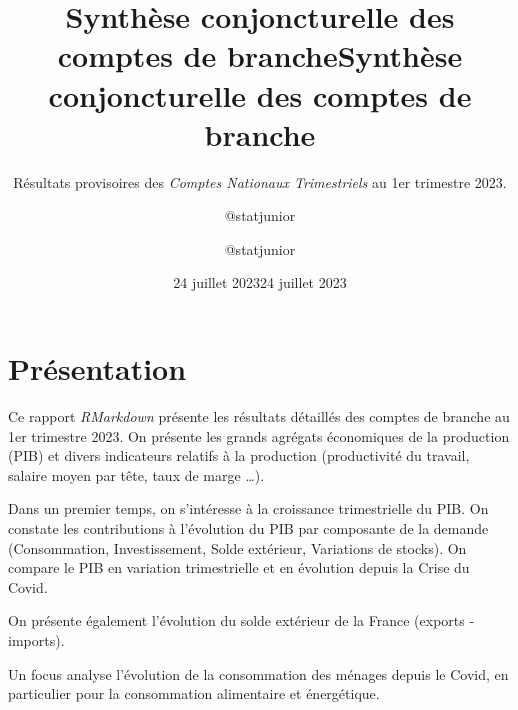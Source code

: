 \documentclass[
  paper=a4,
  ,captions=tableheading
]{scrartcl}
\title{Synthèse conjoncturelle des comptes de branche}
\subtitle{Résultats provisoires des \emph{Comptes Nationaux
Trimestriels} au 1er trimestre 2023.}
\author{@statjunior}
\date{24 juillet 2023}
\title{Synthèse conjoncturelle des comptes de branche}
\author{@statjunior}
\date{24 juillet 2023}
\begin{document}
\begin{titlepage}
\afterpage{\restorepagecolor}
\newcommand{\colorRule}[3][black]{\textcolor[HTML]{#1}{\rule{#2}{#3}}}
\end{titlepage}
\restoregeometry
{} 




\hypertarget{pruxe9sentation}{%
\section{Présentation}\label{pruxe9sentation}}

Ce rapport \emph{RMarkdown} présente les résultats détaillés des comptes
de branche au 1er trimestre 2023. On présente les grands agrégats
économiques de la production (PIB) et divers indicateurs relatifs à la
production (productivité du travail, salaire moyen par tête, taux de
marge \ldots).

Dans un premier temps, on s'intéresse à la croissance trimestrielle du
PIB. On constate les contributions à l'évolution du PIB par composante
de la demande (Consommation, Investissement, Solde extérieur, Variations
de stocks). On compare le PIB en variation trimestrielle et en évolution
depuis la Crise du Covid.

On présente également l'évolution du solde extérieur de la France
(exports - imports).

Un focus analyse l'évolution de la consommation des ménages depuis le
Covid, en particulier pour la consommation alimentaire et énergétique.
\end{document}
